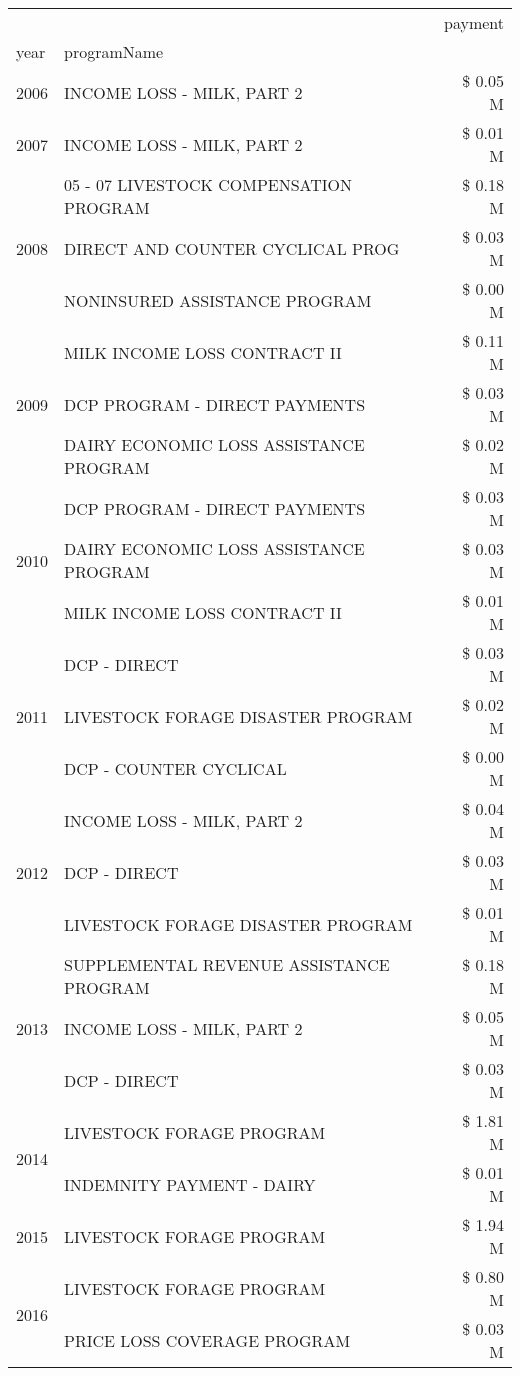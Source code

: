 \begin{tabular}{llr}
\toprule
 &  & payment \\
year & programName &  \\
\midrule
2006 & INCOME LOSS - MILK, PART 2 & \$ 0.05 M \\
\cline{1-3}
2007 & INCOME LOSS - MILK, PART 2 & \$ 0.01 M \\
\cline{1-3}
\multirow[t]{3}{*}{2008} & 05 - 07 LIVESTOCK COMPENSATION PROGRAM & \$ 0.18 M \\
 & DIRECT AND COUNTER CYCLICAL PROG & \$ 0.03 M \\
 & NONINSURED ASSISTANCE PROGRAM & \$ 0.00 M \\
\cline{1-3}
\multirow[t]{3}{*}{2009} & MILK INCOME LOSS CONTRACT II & \$ 0.11 M \\
 & DCP PROGRAM - DIRECT PAYMENTS & \$ 0.03 M \\
 & DAIRY ECONOMIC LOSS ASSISTANCE PROGRAM & \$ 0.02 M \\
\cline{1-3}
\multirow[t]{3}{*}{2010} & DCP PROGRAM - DIRECT PAYMENTS & \$ 0.03 M \\
 & DAIRY ECONOMIC LOSS ASSISTANCE PROGRAM & \$ 0.03 M \\
 & MILK INCOME LOSS CONTRACT II & \$ 0.01 M \\
\cline{1-3}
\multirow[t]{3}{*}{2011} & DCP - DIRECT & \$ 0.03 M \\
 & LIVESTOCK FORAGE DISASTER PROGRAM & \$ 0.02 M \\
 & DCP - COUNTER CYCLICAL & \$ 0.00 M \\
\cline{1-3}
\multirow[t]{3}{*}{2012} & INCOME LOSS - MILK, PART 2 & \$ 0.04 M \\
 & DCP - DIRECT & \$ 0.03 M \\
 & LIVESTOCK FORAGE DISASTER PROGRAM & \$ 0.01 M \\
\cline{1-3}
\multirow[t]{3}{*}{2013} & SUPPLEMENTAL REVENUE ASSISTANCE PROGRAM & \$ 0.18 M \\
 & INCOME LOSS - MILK, PART 2 & \$ 0.05 M \\
 & DCP - DIRECT & \$ 0.03 M \\
\cline{1-3}
\multirow[t]{2}{*}{2014} & LIVESTOCK FORAGE PROGRAM & \$ 1.81 M \\
 & INDEMNITY PAYMENT - DAIRY & \$ 0.01 M \\
\cline{1-3}
2015 & LIVESTOCK FORAGE PROGRAM & \$ 1.94 M \\
\cline{1-3}
\multirow[t]{2}{*}{2016} & LIVESTOCK FORAGE PROGRAM & \$ 0.80 M \\
 & PRICE LOSS COVERAGE PROGRAM & \$ 0.03 M \\

\end{tabular}
